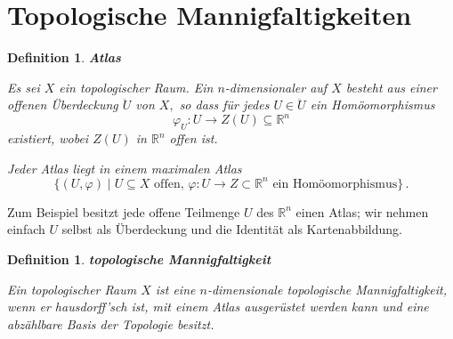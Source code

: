 \documentclass[12pt]{scrbook}   %
\newtheorem{definiX}[alles]{Definition}
\newenvironment{defini}[1]{\begin{definiX}{\bf #1}\par\rm}{\end{definiX}}
\begin{document}
\section{Topologische Mannigfaltigkeiten}

\begin{defini}{Atlas}
Es sei $X$ ein topologischer Raum. Ein $n$-dimensionaler 
 auf $X$ 
besteht aus einer offenen Überdeckung $\ddot U$ von $X,$ so dass für jedes 
$U\in \ddot U$ ein Homöomorphismus 
\[\varphi_U: U \longrightarrow Z(U)\subseteq \mathbb R^n\]
existiert, wobei $Z(U)$ in $\mathbb R^n$ offen ist.

Jeder Atlas liegt in einem {\it maximalen Atlas}
\[
\{ (U,\varphi) \mid U \subseteq X \text{ offen, } \varphi : U \to Z\subset \mathbb R^n\text{ ein Homöomorphismus} \}\,.
\]
\end{defini}

Zum Beispiel besitzt jede offene Teilmenge $U$ des $\mathbb R^n$ einen Atlas; 
wir nehmen einfach $U$ selbst als Überdeckung und die Identität als
Kartenabbildung. 

\begin{defini} {topologische Mannigfaltigkeit}
Ein topologischer Raum $X$ ist eine $n$-dimensionale {\it topologische
Mannigfaltigkeit}, wenn er hausdorff'sch
ist, mit einem Atlas
ausgerüstet werden kann und eine abzählbare Basis der Topologie besitzt.
\end{defini}
\end{document}
